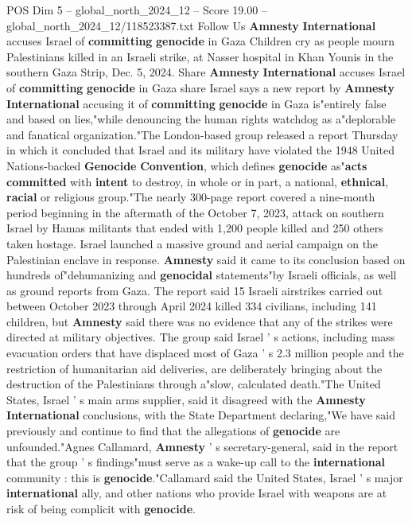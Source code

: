 \begin{textsample}{POS Dim 5 – global\_north\_2024\_12 – Score 19.00 – global\_north\_2024\_12/118523387.txt}  \label{ex:f5_pos_097}
Follow Us \textbf{Amnesty} \textbf{International} accuses Israel of \textbf{committing} \textbf{genocide} in Gaza Children cry as people mourn Palestinians killed in an Israeli strike, at Nasser hospital in Khan Younis in the southern Gaza Strip, Dec. 5, 2024.
Share \textbf{Amnesty} \textbf{International} accuses Israel of \textbf{committing} \textbf{genocide} in Gaza share Israel says a new report by \textbf{Amnesty} \textbf{International} accusing it of \textbf{committing} \textbf{genocide} in Gaza is"entirely false and based on lies,"while denouncing the human rights watchdog as a"deplorable and fanatical organization."The London-based group released a report Thursday in which it concluded that Israel and its military have violated the 1948 United Nations-backed \textbf{Genocide} \textbf{Convention}, which defines \textbf{genocide} as"\textbf{acts} \textbf{committed} with \textbf{intent} to destroy, in whole or in part, a national, \textbf{ethnical}, \textbf{racial} or religious group."The nearly 300-page report covered a nine-month period beginning in the aftermath of the October 7, 2023, attack on southern Israel by Hamas militants that ended with 1,200 people killed and 250 others taken hostage.
Israel launched a massive ground and aerial campaign on the Palestinian enclave in response. \textbf{Amnesty} said it came to its conclusion based on hundreds of"dehumanizing and \textbf{genocidal} statements"by Israeli officials, as well as ground reports from Gaza.
The report said 15 Israeli airstrikes carried out between October 2023 through April 2024 killed 334 civilians, including 141 children, but \textbf{Amnesty} said there was no evidence that any of the strikes were directed at military objectives.
The group said Israel ' s actions, including mass evacuation orders that have displaced most of Gaza ' s 2.3 million people and the restriction of humanitarian aid deliveries, are deliberately bringing about the destruction of the Palestinians through a"slow, calculated death."The United States, Israel ' s main arms supplier, said it disagreed with the \textbf{Amnesty} \textbf{International} conclusions, with the State Department declaring,"We have said previously and continue to find that the allegations of \textbf{genocide} are unfounded."Agnes Callamard, \textbf{Amnesty} ' s secretary-general, said in the report that the group ' s findings"must serve as a wake-up call to the \textbf{international} community : this is \textbf{genocide}."Callamard said the United States, Israel ' s major \textbf{international} ally, and other nations who provide Israel with weapons are at risk of being complicit with \textbf{genocide}.

\end{textsample}
